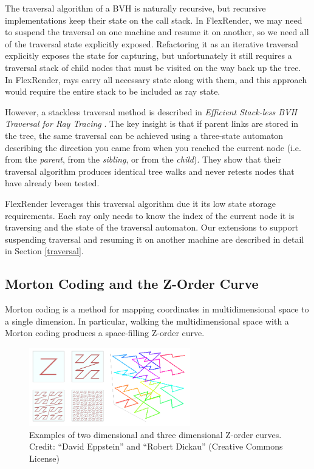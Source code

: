 \documentclass[a4paper,twoside]{article}
\begin{document}
The traversal algorithm of a BVH is naturally recursive, but recursive
implementations keep their state on the call stack. In FlexRender, we may need
to suspend the traversal on one machine and resume it on another, so we need
all of the traversal state explicitly exposed. Refactoring it as an iterative
traversal explicitly exposes the state for capturing, but unfortunately it still
requires a traversal stack of child nodes that must be visited on the way back
up the tree. In FlexRender, rays carry all necessary state along with them,
and this approach would require the entire stack to be included as ray state.

However, a stackless traversal method is described in
\emph{Efficient Stack-less BVH Traversal for Ray Tracing} \cite{hapala:2011}.
The key insight is that if parent links are stored in the tree, the same
traversal can be achieved using a three-state automaton describing the direction
you came from when you reached the current node (i.e. from the \emph{parent},
from the \emph{sibling}, or from the \emph{child}). They show that their
traversal algorithm produces identical tree walks and never retests nodes that
have already been tested.

FlexRender leverages this traversal algorithm due it its low state storage
requirements. Each ray only needs to know the index of the current node it is
traversing and the state of the traversal automaton. Our extensions to support
suspending traversal and resuming it on another machine are described in detail
in Section \ref{traversal}.

\subsection{Morton Coding and the Z-Order Curve}
\label{mortoncoding}

Morton coding is a method for mapping coordinates in multidimensional space to
a single dimension. In particular, walking the multidimensional space with a
Morton coding produces a space-filling Z-order curve.

\begin{figure}[h!]
    \centering
    \includegraphics[width=70mm]{figures/zorder.png}
    \caption{Examples of two dimensional and three dimensional Z-order curves. Credit: ``David Eppstein'' and ``Robert Dickau'' (Creative Commons License)}
    \label{fig:zorder}
\end{figure}
\end{document}
